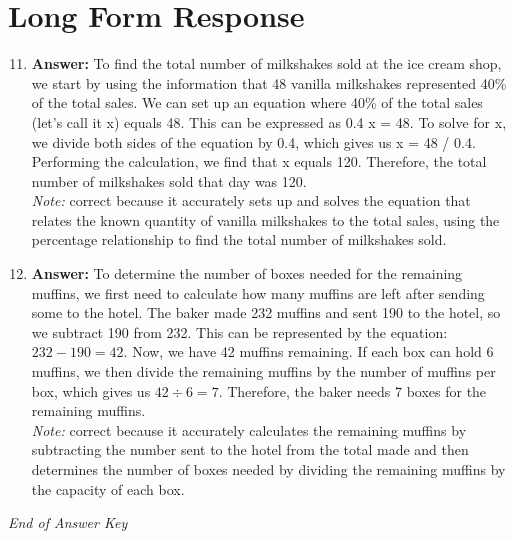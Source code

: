 \documentclass[12pt]{article}
\begin{document}
\section*{Long Form Response}
\begin{enumerate}[label=\arabic*.]
\setcounter{enumi}{10}
\item \textbf{Answer:} To find the total number of milkshakes sold at the ice cream shop, we start by using the information that 48 vanilla milkshakes represented 40\% of the total sales. We can set up an equation where 40\% of the total sales (let's call it x) equals 48. This can be expressed as 0.4 x = 48. To solve for x, we divide both sides of the equation by 0.4, which gives us x = 48 / 0.4. Performing the calculation, we find that x equals 120. Therefore, the total number of milkshakes sold that day was 120.
\\ \textit{Note:} correct because it accurately sets up and solves the equation that relates the known quantity of vanilla milkshakes to the total sales, using the percentage relationship to find the total number of milkshakes sold.
\item \textbf{Answer:} To determine the number of boxes needed for the remaining muffins, we first need to calculate how many muffins are left after sending some to the hotel. The baker made 232 muffins and sent 190 to the hotel, so we subtract 190 from 232. This can be represented by the equation: \( 232 - 190 = 42 \). Now, we have 42 muffins remaining. If each box can hold 6 muffins, we then divide the remaining muffins by the number of muffins per box, which gives us \( 42 \div 6 = 7 \). Therefore, the baker needs 7 boxes for the remaining muffins.
\\ \textit{Note:} correct because it accurately calculates the remaining muffins by subtracting the number sent to the hotel from the total made and then determines the number of boxes needed by dividing the remaining muffins by the capacity of each box.
\end{enumerate}

\vfill
\noindent\textit{End of Answer Key}
\end{document}
